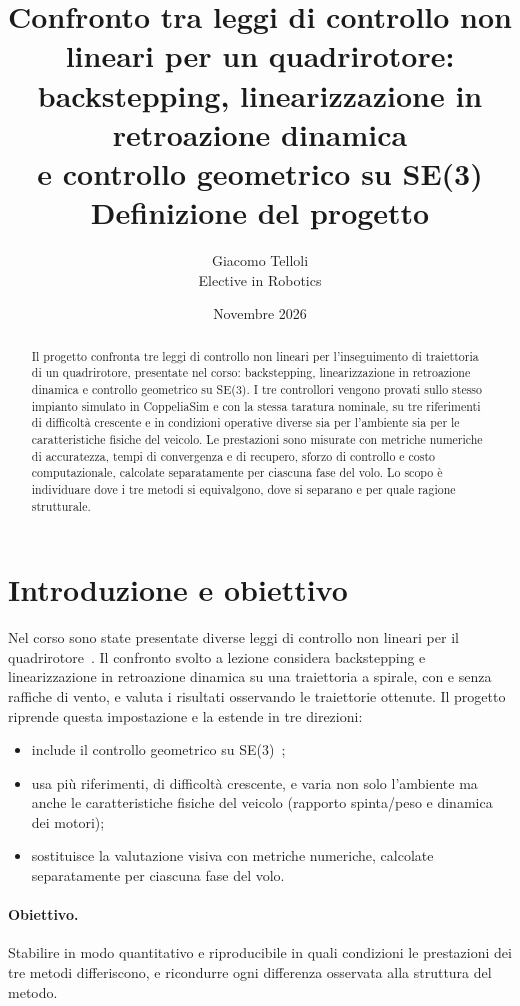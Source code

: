 \documentclass[11pt,a4paper]{article}
\title{Confronto tra leggi di controllo non lineari per un quadrirotore:\\
backstepping, linearizzazione in retroazione dinamica\\
e controllo geometrico su SE(3)\\[0.6em]
\large Definizione del progetto}
\author{Giacomo Telloli\\[0.2em] \small Elective in Robotics}
\date{Novembre 2026}
\begin{document}
\maketitle

\begin{abstract}
Il progetto confronta tre leggi di controllo non lineari per l'inseguimento di traiettoria di un quadrirotore, presentate nel corso: backstepping, linearizzazione in retroazione dinamica e controllo geometrico su SE(3). I tre controllori vengono provati sullo stesso impianto simulato in CoppeliaSim e con la stessa taratura nominale, su tre riferimenti di difficoltà crescente e in condizioni operative diverse sia per l'ambiente sia per le caratteristiche fisiche del veicolo. Le prestazioni sono misurate con metriche numeriche di accuratezza, tempi di convergenza e di recupero, sforzo di controllo e costo computazionale, calcolate separatamente per ciascuna fase del volo. Lo scopo è individuare dove i tre metodi si equivalgono, dove si separano e per quale ragione strutturale.
\end{abstract}

\section{Introduzione e obiettivo}

Nel corso sono state presentate diverse leggi di controllo non lineari per il quadrirotore~\cite{slide}. Il confronto svolto a lezione considera backstepping e linearizzazione in retroazione dinamica su una traiettoria a spirale, con e senza raffiche di vento, e valuta i risultati osservando le traiettorie ottenute. Il progetto riprende questa impostazione e la estende in tre direzioni:
\begin{itemize}
  \item include il controllo geometrico su SE(3)~\cite{lee};
  \item usa più riferimenti, di difficoltà crescente, e varia non solo l'ambiente ma anche le caratteristiche fisiche del veicolo (rapporto spinta/peso e dinamica dei motori);
  \item sostituisce la valutazione visiva con metriche numeriche, calcolate separatamente per ciascuna fase del volo.
\end{itemize}

\paragraph{Obiettivo.} Stabilire in modo quantitativo e riproducibile in quali condizioni le prestazioni dei tre metodi differiscono, e ricondurre ogni differenza osservata alla struttura del metodo.
\end{document}
